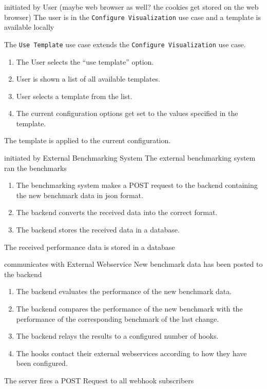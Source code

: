 \bigskip

{initiated by User (maybe web browser as well? the cookies get stored on the web browser)}
{The user is in the \texttt{Configure Visualization} use case and a \gls{template} is available locally}
{The \texttt{Use Template} use case extends the \texttt{Configure Visualization} use case.
\begin{enumerate}
    \item The User selects the \enquote{use template} option.
    \item User is shown a list of all available \glspl{template}.
    \item User selects a \gls{template} from the list.
    \item The current \gls{configuration} options get set to the values specified in the template.
\end{enumerate}} 
{The \gls{template} is applied to the current configuration.}

\bigskip

{initiated by External Benchmarking System}
{The external benchmarking system ran the benchmarks}
{\begin{enumerate}
    \item The benchmarking system makes a POST request to the backend containing the new benchmark data in \acrshort{json} format.
    \item The backend converts the received data into the correct format.
    \item The backend stores the received data in a database.
\end{enumerate}} 
{The received performance data is stored in a database}

\bigskip

{communicates with External Webservice}
{New benchmark data has been posted to the backend}
{\begin{enumerate}
    \item The backend evaluates the performance of the new benchmark data.
    \item The backend compares the performance of the new benchmark with the performance of the corresponding benchmark of the last change.
    \item The backend relays the results to a configured number of hooks.
    \item The hooks contact their external webservices according to how they have been configured.
\end{enumerate}}
{The server fires a POST Request to all webhook subscribers}

